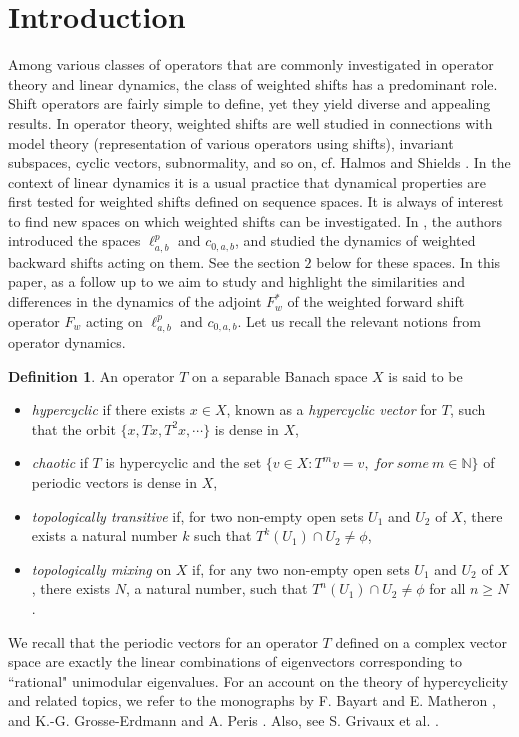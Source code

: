 \documentclass[12pt, reqno]{amsart}
\theoremstyle{definition}
\newtheorem{definition}[theorem]{Definition}
\theoremstyle{remark}
\numberwithin{equation}{section}
\begin{document}
\section{Introduction}


Among various classes of operators that are commonly investigated in operator theory and linear dynamics, the class of weighted shifts has a predominant role. Shift operators are fairly simple to define, yet they yield diverse and appealing results. In operator theory, weighted shifts are well studied in connections with model theory (representation of various operators using shifts), invariant subspaces, cyclic vectors, subnormality, and so on, cf. Halmos \cite{Halmos} and Shields \cite{Shields}. In the context of linear dynamics it is a usual practice that dynamical properties are first tested for weighted shifts defined on sequence spaces.  It is always of interest to find new spaces on which weighted shifts can be investigated. In \cite{Das-Mundayadan}, the authors introduced the spaces $\ell^p_{a,b}$ and $c_{0,a,b}$, and studied the dynamics of weighted backward shifts acting on them. See the section $2$ below for these spaces. In this paper, as a follow up to \cite{Das-Mundayadan} we aim to study and highlight the similarities and differences in the dynamics of the adjoint $F_w^*$ of the weighted forward shift operator $F_w$ acting on $\ell^p_{a,b}$ and $c_{0,a,b}$. Let us recall the relevant notions from operator dynamics.

 
  
 \begin{definition}
 An operator $T$ on a separable Banach space $X$ is said to be
 \begin{itemize}
 \item \textit{hypercyclic} if there exists $x\in X$, known as a \textit{hypercyclic vector} for $T$, such that the orbit $\{x,Tx,T^2x,\cdots\}$ is dense in $X$,
\item \textit{chaotic} if $T$ is hypercyclic and the set $\{v\in X:T^mv=v,~for ~some~m\in \mathbb{N}\}$ of periodic vectors is dense in $X$,
\item \textit{topologically transitive} if, for two non-empty open sets $U_1$ and $U_2$ of $X$, there exists a natural number $k$ such that $T^k(U_1)\cap U_2\neq \phi$, 
\item \textit{topologically mixing} on $X$ if, for any two non-empty open sets $U_1$ and $U_2$ of $X$, there exists $N$, a natural number, such that $T^n(U_1)\cap U_2\neq \phi$ for all $n\geq N$. 
 \end{itemize}
 \end{definition}
\noindent We recall that the periodic vectors for an operator $T$ defined on a complex vector space are exactly the linear combinations of eigenvectors corresponding to ``rational" unimodular eigenvalues. For an account on the theory of hypercyclicity and related topics, we refer to the monographs by F. Bayart and E. Matheron \cite{Bayart-Matheron}, and K.-G. Grosse-Erdmann and A. Peris \cite{Erdmann-Peris}. Also, see S. Grivaux et al. \cite{Grivaux etal}.
\end{document}
